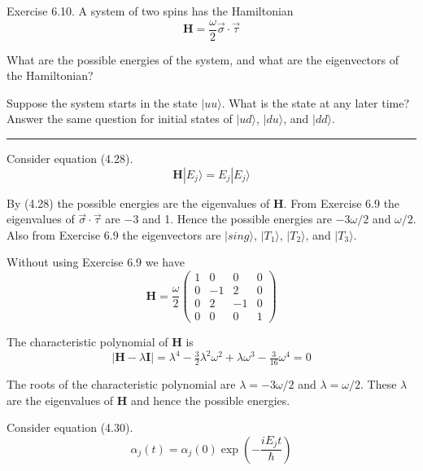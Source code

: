 \documentclass[12pt]{article}
\begin{document}
Exercise 6.10.
A system of two spins has the Hamiltonian
\begin{equation*}
\mathbf H=\frac{\omega}{2}\vec\sigma\cdot\vec\tau
\end{equation*}

What are the possible energies of the system, and what are the
eigenvectors of the Hamiltonian?

\bigskip
Suppose the system starts in the state $|uu\rangle$.
What is the state at any later time?
Answer the same question for initial states of
$|ud\rangle$, $|du\rangle$, and $|dd\rangle$.

\bigskip
\hrule

\bigskip
Consider equation (4.28).
\begin{equation*}
\mathbf H|E_j\rangle=E_j|E_j\rangle
\tag{4.28}
\end{equation*}

By (4.28) the possible energies are the eigenvalues of $\mathbf H$.
From Exercise 6.9 the eigenvalues of $\vec\sigma\cdot\vec\tau$ are $-3$ and 1.
Hence the possible energies are $-3\omega/2$ and $\omega/2$.
Also from Exercise 6.9 the eigenvectors are
$|sing\rangle$, $|T_1\rangle$, $|T_2\rangle$, and $|T_3\rangle$.

\bigskip
Without using Exercise 6.9 we have
\begin{equation*}
\mathbf H=\frac{\omega}{2}
\begin{pmatrix}
1&0&0&0
\\
0&-1&2&0
\\
0&2&-1&0
\\
0&0&0&1
\end{pmatrix}
\end{equation*}

The characteristic polynomial of $\mathbf H$ is
\begin{equation*}
|\mathbf H-\lambda\mathbf I|
=\lambda^4-\tfrac{3}{2}\lambda^2\omega^2+\lambda\omega^3-\tfrac{3}{16}\omega^4=0
\end{equation*}

The roots of the characteristic polynomial are $\lambda=-3\omega/2$ and $\lambda=\omega/2$.
These $\lambda$ are the eigenvalues of $\mathbf H$ and hence the possible energies.

\bigskip
Consider equation (4.30).
\begin{equation*}
\alpha_j(t)=\alpha_j(0)\exp\left(-\frac{iE_jt}{\hbar}\right)
\tag{4.30}
\end{equation*}
\end{document}
